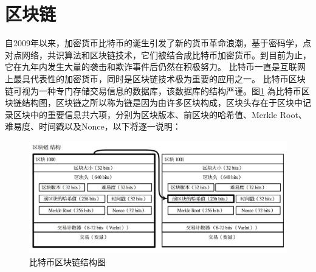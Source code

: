 		\section{区块链}
		自2009年以来，加密货币比特币的诞生引发了新的货币革命浪潮，基于密码学，点对点网络，共识算法和区块链技术，它们被结合成比特币加密货币。到目前为止，它在九年内发生大量的袭击和欺诈事件后仍然在积极努力。 比特币一直是互联网上最具代表性的加密货币，同时是区块链技术极为重要的应用之一。
		比特币区块链可视为一种专门存储交易信息的数据库，该数据库的结构严谨。图\ref{blockchain} 為⽐特币区块链结构图，区块链之所以称为链是因为由许多区块构成，区块头存在于区块中记录区块中的重要信息共六项，分别为区块版本、前区块的哈希值、Merkle Root、难易度、时间戳以及Nonce，以下将逐一说明：

			\begin{figure}[!htbp]
				\centering
				\includegraphics[width = 1\textwidth]{blockchain.jpg}
				\caption{比特币区块链结构图}\label{blockchain}
			\end{figure}

